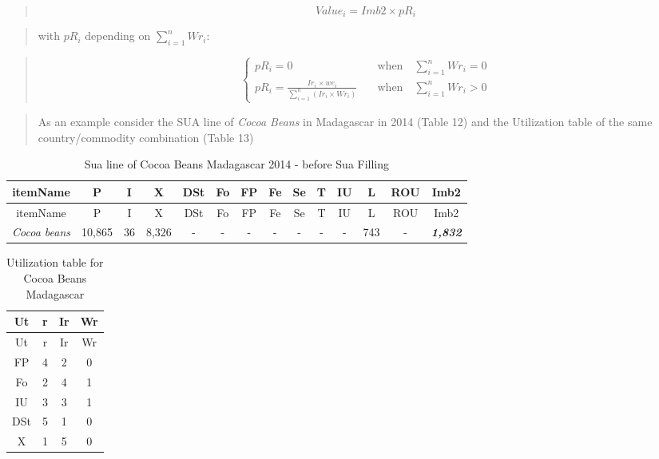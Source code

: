 \documentclass[]{article}
\begin{document}
\begin{quote}
\begin{equation}
\label{eq:inverseRank}
Value_{i} = Imb2 \times pR_{i}
\end{equation}
\end{quote}

\begin{quote}
with \(pR_{i}\) depending on \(\sum \limits_{i=1}^n Wr_{i}\):
\end{quote}

\begin{quote}
\begin{equation}
\label{eq:weightRank}
\begin{cases}
pR_{i} = 0     & \quad \text{when} \quad \sum \limits_{i=1}^n Wr_{i} = 0\\
pR_{i} = \frac{Ir_{i}\times we_{i}}{\sum \limits_{i=1}^n\left(Ir_{i}\times Wr_{i}\right)}     & \quad \text{when} \quad \sum \limits_{i=1}^n Wr_{i} > 0 
\end{cases}
\end{equation}
\end{quote}

\begin{quote}
\end{quote}

\begin{quote}
As an example consider the SUA line of \emph{Cocoa Beans} in Madagascar
in 2014 (Table 12) and the Utilization table of the same
country/commodity combination (Table 13)
\end{quote}

\begin{longtable}[]{@{}cccccccccccccc@{}}
\caption{Sua line of Cocoa Beans Madagascar 2014 - before Sua
Filling}\tabularnewline
\toprule
itemName & P & I & X & DSt & Fo & FP & Fe & Se & T & IU & L & ROU &
Imb2\tabularnewline
\midrule
\endfirsthead
\toprule
itemName & P & I & X & DSt & Fo & FP & Fe & Se & T & IU & L & ROU &
Imb2\tabularnewline
\midrule
\endhead
\emph{Cocoa beans} & 10,865 & 36 & 8,326 & - & - & - & - & - & - & - &
743 & - & \textbf{\emph{1,832}}\tabularnewline
\bottomrule
\end{longtable}

\begin{longtable}[]{@{}cccc@{}}
\caption{Utilization table for Cocoa Beans Madagascar}\tabularnewline
\toprule
Ut & r & Ir & Wr\tabularnewline
\midrule
\endfirsthead
\toprule
Ut & r & Ir & Wr\tabularnewline
\midrule
\endhead
FP & 4 & 2 & 0\tabularnewline
Fo & 2 & 4 & 1\tabularnewline
IU & 3 & 3 & 1\tabularnewline
DSt & 5 & 1 & 0\tabularnewline
X & 1 & 5 & 0\tabularnewline
\bottomrule
\end{longtable}
\end{document}
